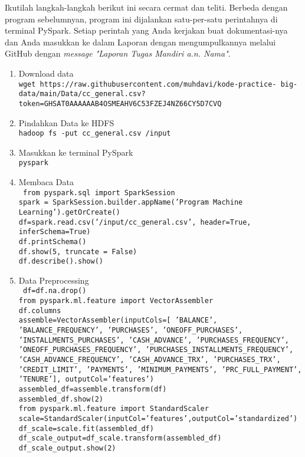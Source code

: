 \documentclass[a4paper]{tufte-handout}
\begin{document}

Ikutilah langkah-langkah berikut ini secara cermat dan teliti. Berbeda dengan program sebelumnyan, program ini dijalankan satu-per-satu perintahnya di terminal PySpark. Setiap perintah yang Anda kerjakan buat dokumentasi-nya dan Anda masukkan ke dalam Laporan dengan mengumpulkannya melalui GitHub dengan \textit{message "Laporan Tugas Mandiri a.n. Nama"}.

\begin{enumerate}
\item Download data \\
{\tt wget https://raw.githubusercontent.com/muhdavi/kode-practice- big-data/main/Data/cc\_general.csv?token=GHSAT0AAAAAAB4OSMEAHV6C53FZEJ4NZ66CY5D7CVQ}

\item Pindahkan Data ke HDFS \\
{\tt hadoop fs -put cc\_general.csv /input}

\item Masukkan ke terminal PySpark \\
{\tt pyspark}

\item Membaca Data \\
{\tt 
from pyspark.sql import SparkSession \\
spark = SparkSession.builder.appName('Program Machine Learning').getOrCreate() \\
df=spark.read.csv('/input/cc\_general.csv', header=True, inferSchema=True) \\
df.printSchema() \\
df.show(5, truncate = False) \\
df.describe().show() \\
}
\item Data Preprocessing \\
{\tt
df=df.na.drop() \\
from pyspark.ml.feature import VectorAssembler \\
df.columns \\
assemble=VectorAssembler(inputCols=[
 'BALANCE',
 'BALANCE\_FREQUENCY',
 'PURCHASES',
 'ONEOFF\_PURCHASES',
 'INSTALLMENTS\_PURCHASES',
 'CASH\_ADVANCE',
 'PURCHASES\_FREQUENCY',
 'ONEOFF\_PURCHASES\_FREQUENCY',
 'PURCHASES\_INSTALLMENTS\_FREQUENCY',
 'CASH\_ADVANCE\_FREQUENCY',
 'CASH\_ADVANCE\_TRX',
 'PURCHASES\_TRX',
 'CREDIT\_LIMIT',
 'PAYMENTS',
 'MINIMUM\_PAYMENTS',
 'PRC\_FULL\_PAYMENT',
 'TENURE'], outputCol='features') \\
assembled\_df=assemble.transform(df) \\
assembled\_df.show(2) \\
from pyspark.ml.feature import StandardScaler \\
scale=StandardScaler(inputCol='features',outputCol='standardized') \\
df\_scale=scale.fit(assembled\_df) \\
df\_scale\_output=df\_scale.transform(assembled\_df) \\
df\_scale\_output.show(2)
}


\end{enumerate}
\end{document}
